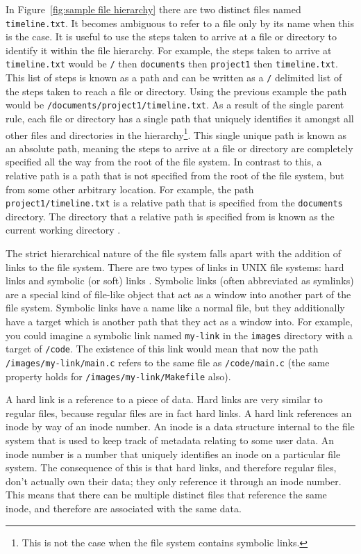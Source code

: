 In Figure~\ref{fig:sample file hierarchy} there are two distinct files named
\texttt{timeline.txt}. It becomes ambiguous to refer to a file only by its name
when this is the case. It is useful to use the steps taken to arrive at a file
or directory to identify it within the file hierarchy. For example, the steps
taken to arrive at \texttt{timeline.txt} would be \texttt{/} then
\texttt{documents} then \texttt{project1} then \texttt{timeline.txt}. This list
of steps is known as a path and can be written as a \texttt{/} delimited list
of the steps taken to reach a file or directory. Using the previous example the
path would be \texttt{/documents/project1/timeline.txt}. As a result of the
single parent rule, each file or directory has a single path that uniquely
identifies it amongst all other files and directories in the
hierarchy\footnote{This is not the case when the file system contains symbolic
links.}. This single unique path is known as an absolute path, meaning the
steps to arrive at a file or directory are completely specified all the way
from the root of the file system. In contrast to this, a relative path is a
path that is not specified from the root of the file system, but from some
other arbitrary location. For example, the path \texttt{project1/timeline.txt}
is a relative path that is specified from the \texttt{documents} directory. The
directory that a relative path is specified from is known as the current
working directory \cite{unix-intro}.

The strict hierarchical nature of the file system falls apart with the addition
of links to the file system. There are two types of links in UNIX file systems:
hard links \cite{link} and symbolic (or soft) links \cite{symlink}. Symbolic
links (often abbreviated as symlinks) are a special kind of file-like object
that act as a window into another part of the file system. Symbolic links have
a name like a normal file, but they additionally have a target which is another
path that they act as a window into. For example, you could imagine a symbolic
link named \texttt{my-link} in the \texttt{images} directory with a target of
\texttt{/code}. The existence of this link would mean that now the path
\texttt{/images/my-link/main.c} refers to the same file as
\texttt{/code/main.c} (the same property holds for
\texttt{/images/my-link/Makefile} also).

A hard link is a reference to a piece of data. Hard links are very similar to
regular files, because regular files are in fact hard links. A hard link
references an inode \cite{inode} by way of an inode number. An inode is a data
structure internal to the file system that is used to keep track of metadata
relating to some user data. An inode number is a number that uniquely
identifies an inode on a particular file system. The consequence of this is
that hard links, and therefore regular files, don't actually own their data;
they only reference it through an inode number. This means that there can be
multiple distinct files that reference the same inode, and therefore are
associated with the same data.


